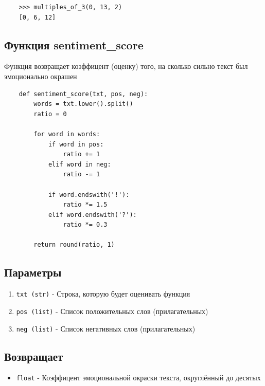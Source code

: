 \documentclass{article}
\begin{document}
        \begin{verbatim}
    >>> multiples_of_3(0, 13, 2)
    [0, 6, 12]
        \end{verbatim}



    \hrulefill

    \subsection{Функция sentiment\_score}
    
    Функция возвращает коэффицент (оценку) того, на сколько сильно текст был эмоционально окрашен

    
    \begin{verbatim}
    def sentiment_score(txt, pos, neg):
        words = txt.lower().split()
        ratio = 0
        
        for word in words:
            if word in pos:
                ratio += 1  
            elif word in neg:
                ratio -= 1 
    
            if word.endswith('!'): 
                ratio *= 1.5  
            elif word.endswith('?'):
                ratio *= 0.3 
                
        return round(ratio, 1)

    \end{verbatim}
    
    \subsection*{Параметры}
        \begin{enumerate}
            \item \texttt{txt (str)} - Строка, которую будет оценивать функция
            \item \texttt{pos (list)} - Список положительных слов (прилагательных)
            \item \texttt{neg (list)} -  Список негативных слов (прилагательных)
        \end{enumerate}
        
        \subsection*{Возвращает}
        \begin{itemize}
            \item \texttt{float} - Коэффицент эмоциональной окраски текста, округлённый до десятых  
        \end{itemize}
    
\end{document}
